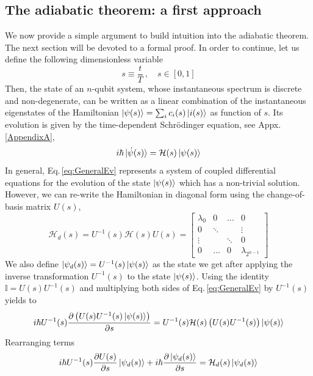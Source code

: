 \subsection{The adiabatic theorem: a first approach}
We now provide a simple argument to build intuition into the adiabatic theorem. The next section will be devoted to a formal proof. In order to continue, let us define the following dimensionless variable
\begin{equation}
    s \equiv \frac{t}{T} \ , \quad s \in [0,1]
\end{equation}
Then, the state of an $n$-qubit system, whose instantaneous spectrum is discrete and non-degenerate, can be written as a linear combination of the instantaneous eigenstates of the Hamiltonian $\ket{\psi(s)} = \sum_{i}c_{i}(s)\ket{i(s)}$ as function of $s$. Its evolution is given by the time-dependent Schrödinger equation, see Appx.\,\ref{AppendixA},
\begin{equation}
\label{eq:GeneralEv}
    i\hbar \ket{\dot{\psi}(s)} = \mathcal{H}(s) \ket{\psi(s)}
\end{equation}
In general, Eq.\,\eqref{eq:GeneralEv} represents a system of coupled differential equations for the evolution of the state $\ket{\psi(s)}$ which has a non-trivial solution. However, we can re-write the Hamiltonian in diagonal form using the change-of-basis matrix $U(s)$,
\begin{equation}
    \mathcal{H}_{d}(s) = U^{-1}(s)\mathcal{H}(s)U(s) = \begin{bmatrix}
           \lambda_{0} & 0 & \hdots & 0 \\
           0 &  \ddots & & \vdots \\
           \vdots &   & \ddots & 0 \\
           0 & \hdots & 0 & \lambda_{2^{n-1}}
         \end{bmatrix}
\end{equation}
We also define $\ket{\psi_{d}(s)} = U^{-1}(s)\ket{\psi(s)}$ as the state we get after applying the inverse transformation $U^{-1}(s)$ to the state $\ket{\psi(s)}$. Using the identity $\mathbb{I} = U(s)U^{-1}(s)$ and multiplying both sides of Eq.\,\eqref{eq:GeneralEv} by $U^{-1}(s)$ yields to
\begin{equation}
     i\hbar U^{-1}(s) \frac{\partial \left(U(s)U^{-1}(s)\ket{\psi(s)}\right)}{\partial s} = U^{-1}(s)\mathcal{H}(s) \left(U(s)U^{-1}(s)\right)\ket{\psi(s)}
\end{equation}
Rearranging terms
\begin{equation}
     i\hbar U^{-1}(s) \frac{\partial U(s)}{\partial s}\ket{\psi_{d}(s)} + i\hbar  \frac{\partial \ket{\psi_{d}(s)}}{\partial s}= \mathcal{H}_{d}(s)\ket{\psi_{d}(s)}
\end{equation}
